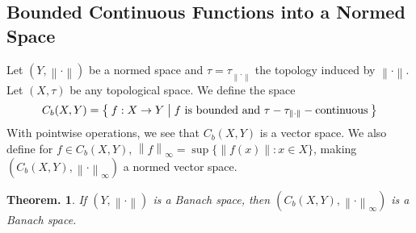 \documentclass[11pt, a4paper]{memoir}
\newcommand{\norm}[1]{\ensuremath{\left\lVert#1\right\rVert}}
\theoremstyle{change}
\newtheorem{theorem}{Theorem.}[section]
\theoremstyle{plain}
\theoremstyle{nonumberplain}
\numberwithin{equation}{section}
\begin{document}
\subsection{Bounded Continuous Functions into a Normed Space}
Let $(Y,\norm{\cdot})$ be a normed space and $\tau=\tau_{\norm{\cdot}}$ the topology induced by $\norm{\cdot}$.
Let $(X,\tau)$ be any topological space.
We define the space
\begin{equation*}
    C_b(X,Y) = \Set{f:X\to Y | f\text{ is bounded  and }\tau-\tau_{\norm{\cdot}}-\text{continuous}}
\end{equation*}
With pointwise operations, we see that $C_b(X,Y)$ is a vector space.
We also define for $f\in C_b(X,Y)$, $\norm{f}_\infty=\sup\{\norm{f(x)}:x\in X\}$, making $(C_b(X,Y),\norm{\cdot}_\infty)$ a normed vector space.
\begin{theorem}\label{t:cban}
    If $(Y,\norm{\cdot})$ is a Banach space, then $(C_b(X,Y),\norm{\cdot}_\infty)$ is a Banach space.
\end{theorem}
\end{document}

